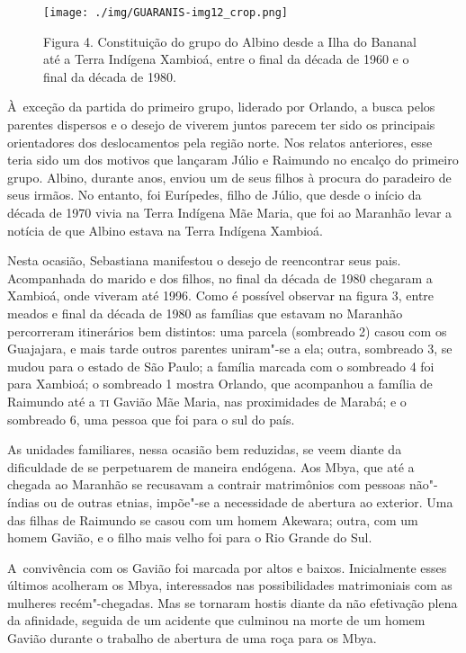 \begin{figure}
  \centering
 \texttt{[image: ./img/GUARANIS-img12\_crop.png]}	
  \hfill
  \caption{Figura 4. Constituição do grupo do Albino desde a Ilha do Bananal até a Terra Indígena Xambioá, entre o final da década de 1960 e o final da década de 1980.}
\end{figure}
 

À~exceção da partida do primeiro grupo, liderado por Orlando, a busca
pelos parentes dispersos e o desejo de viverem juntos parecem ter sido
os principais orientadores dos deslocamentos pela região norte. Nos
relatos anteriores, esse teria sido um dos motivos que lançaram Júlio e
Raimundo no encalço do primeiro grupo. Albino, durante anos, enviou um
de seus filhos à procura do paradeiro de seus irmãos. No entanto, foi
Eurípedes, filho de Júlio, que desde o início da década de 1970 vivia na
Terra Indígena Mãe Maria, que foi ao Maranhão levar a notícia de que
Albino estava na Terra Indígena Xambioá.

Nesta ocasião, Sebastiana manifestou o desejo de reencontrar seus pais.
Acompanhada do marido e dos filhos, no final da década de 1980 chegaram
a Xambioá, onde viveram até 1996. Como é possível observar na figura 3,
entre meados e final da década de 1980 as famílias que estavam no
Maranhão percorreram itinerários bem distintos: uma parcela (sombreado
2) casou com os Guajajara, e mais tarde outros parentes uniram"-se a ela; 
outra, sombreado 3, se mudou para o estado de São Paulo; a
família marcada com o sombreado 4 foi para Xambioá; o sombreado 1
mostra Orlando, que acompanhou a família de Raimundo até a \textsc{ti} Gavião
Mãe Maria, nas proximidades de Marabá; e o sombreado 6, uma pessoa que
foi para o sul do país.

As unidades familiares, nessa ocasião bem reduzidas, se veem diante da
dificuldade de se perpetuarem de maneira endógena. Aos Mbya, que até a
chegada ao Maranhão se recusavam a contrair matrimônios com pessoas
não"-índias ou de outras etnias, impõe"-se a necessidade de abertura ao
exterior. Uma das filhas de Raimundo se casou com um homem Akewara;
outra, com um homem Gavião, e o filho mais velho foi para o Rio Grande
do Sul. 

A~convivência com os Gavião foi marcada por altos e baixos. Inicialmente
esses últimos acolheram os Mbya, interessados nas possibilidades
matrimoniais com as mulheres recém"-chegadas. Mas se tornaram hostis
diante da não efetivação plena da afinidade, seguida de um acidente que
culminou na morte de um homem Gavião durante o trabalho de abertura de
uma roça para os Mbya.

